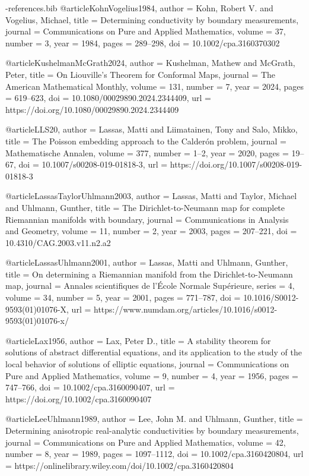 \documentclass[11pt,a4paper]{article}
\theoremstyle{definition}
\theoremstyle{remark}
\numberwithin{equation}{section}
\begin{document}
\begin{filecontents*}[overwrite]{\jobname-references.bib}
@article{KohnVogelius1984,
  author = {Kohn, Robert V. and Vogelius, Michael},
  title = {Determining conductivity by boundary measurements},
  journal = {Communications on Pure and Applied Mathematics},
  volume = {37},
  number = {3},
  year = {1984},
  pages = {289--298},
  doi = {10.1002/cpa.3160370302}
}

@article{KushelmanMcGrath2024,
  author  = {Kushelman, Mathew and McGrath, Peter},
  title   = {On {Liouville}'s Theorem for Conformal Maps},
  journal = {The American Mathematical Monthly},
  volume  = {131},
  number  = {7},
  year    = {2024},
  pages   = {619--623},
  doi     = {10.1080/00029890.2024.2344409},
  url     = {https://doi.org/10.1080/00029890.2024.2344409}
}

@article{LLS20,
  author  = {Lassas, Matti and Liimatainen, Tony and Salo, Mikko},
  title   = {The {Poisson} embedding approach to the {Calder\'on} problem},
  journal = {Mathematische Annalen},
  volume  = {377},
  number  = {1--2},
  year    = {2020},
  pages   = {19--67},
  doi     = {10.1007/s00208-019-01818-3},
  url     = {https://doi.org/10.1007/s00208-019-01818-3}
}

@article{LassasTaylorUhlmann2003,
  author = {Lassas, Matti and Taylor, Michael and Uhlmann, Gunther},
  title = {The {Dirichlet-to-Neumann} map for complete {Riemannian} manifolds with boundary},
  journal = {Communications in Analysis and Geometry},
  volume = {11},
  number = {2},
  year = {2003},
  pages = {207--221},
  doi = {10.4310/CAG.2003.v11.n2.a2}
}

@article{LassasUhlmann2001,
  author = {Lassas, Matti and Uhlmann, Gunther},
  title = {On determining a {Riemannian} manifold from the {Dirichlet-to-Neumann} map},
  journal = {Annales scientifiques de l'{\'E}cole Normale Sup{\'e}rieure},
  series = {4},
  volume = {34},
  number = {5},
  year = {2001},
  pages = {771--787},
  doi = {10.1016/S0012-9593(01)01076-X},
  url = {https://www.numdam.org/articles/10.1016/s0012-9593(01)01076-x/}
}

@article{Lax1956,
  author = {Lax, Peter D.},
  title = {A stability theorem for solutions of abstract differential equations, and its application to the study of the local behavior of solutions of elliptic equations},
  journal = {Communications on Pure and Applied Mathematics},
  volume = {9},
  number = {4},
  year = {1956},
  pages = {747--766},
  doi = {10.1002/cpa.3160090407},
  url = {https://doi.org/10.1002/cpa.3160090407}
}

@article{LeeUhlmann1989,
  author = {Lee, John M. and Uhlmann, Gunther},
  title = {Determining anisotropic real-analytic conductivities by boundary measurements},
  journal = {Communications on Pure and Applied Mathematics},
  volume = {42},
  number = {8},
  year = {1989},
  pages = {1097--1112},
  doi = {10.1002/cpa.3160420804},
  url = {https://onlinelibrary.wiley.com/doi/10.1002/cpa.3160420804}
}


\end{filecontents*}
\end{document}
